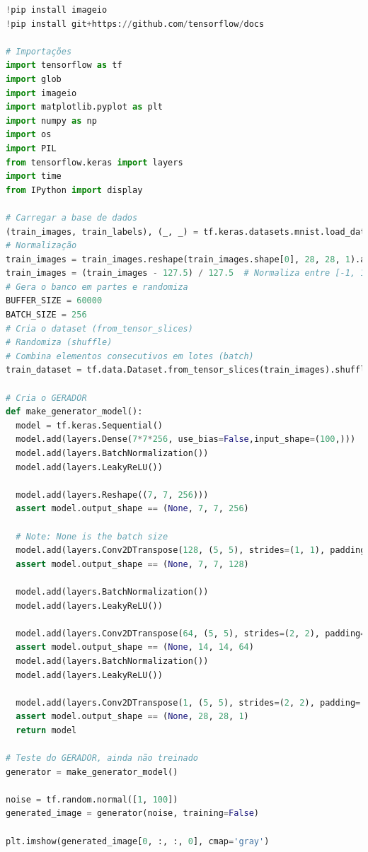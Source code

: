 \begin{lstlisting}[language=Python, style=input]
!pip install imageio
!pip install git+https://github.com/tensorflow/docs

# Importações
import tensorflow as tf
import glob
import imageio
import matplotlib.pyplot as plt
import numpy as np
import os
import PIL
from tensorflow.keras import layers
import time
from IPython import display

# Carregar a base de dados
(train_images, train_labels), (_, _) = tf.keras.datasets.mnist.load_data()
# Normalização
train_images = train_images.reshape(train_images.shape[0], 28, 28, 1).astype('float32')
train_images = (train_images - 127.5) / 127.5  # Normaliza entre [-1, 1]
# Gera o banco em partes e randomiza
BUFFER_SIZE = 60000
BATCH_SIZE = 256
# Cria o dataset (from_tensor_slices)
# Randomiza (shuffle)
# Combina elementos consecutivos em lotes (batch)
train_dataset = tf.data.Dataset.from_tensor_slices(train_images).shuffle(BUFFER_SIZE).batch(BATCH_SIZE)

# Cria o GERADOR
def make_generator_model():
  model = tf.keras.Sequential()
  model.add(layers.Dense(7*7*256, use_bias=False,input_shape=(100,)))
  model.add(layers.BatchNormalization())
  model.add(layers.LeakyReLU())

  model.add(layers.Reshape((7, 7, 256)))
  assert model.output_shape == (None, 7, 7, 256)

  # Note: None is the batch size
  model.add(layers.Conv2DTranspose(128, (5, 5), strides=(1, 1), padding='same', use_bias=False))
  assert model.output_shape == (None, 7, 7, 128)

  model.add(layers.BatchNormalization())
  model.add(layers.LeakyReLU())

  model.add(layers.Conv2DTranspose(64, (5, 5), strides=(2, 2), padding='same', use_bias=False))
  assert model.output_shape == (None, 14, 14, 64)
  model.add(layers.BatchNormalization())
  model.add(layers.LeakyReLU())

  model.add(layers.Conv2DTranspose(1, (5, 5), strides=(2, 2), padding='same', use_bias=False, activation='tanh'))
  assert model.output_shape == (None, 28, 28, 1)
  return model

# Teste do GERADOR, ainda não treinado
generator = make_generator_model()

noise = tf.random.normal([1, 100])
generated_image = generator(noise, training=False)

plt.imshow(generated_image[0, :, :, 0], cmap='gray')
\end{lstlisting}

